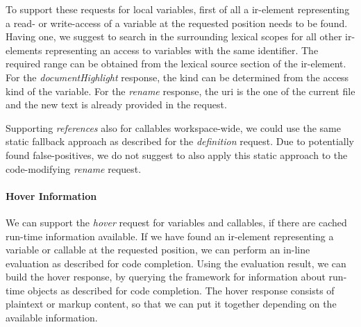 \documentclass[sigplan,10pt,review,anonymous]{acmart}
\begin{document}
    To support these requests for local variables, first of all a
    \ac{ir}-element representing a read- or write-access of a variable at the
    requested position needs to be found. Having one, we suggest to search in
    the surrounding lexical scopes for all other \ac{ir}-elements representing
    an access to variables with the same identifier. The required range can be
    obtained from the lexical source section of the \ac{ir}-element. For the
    \emph{documentHighlight} response, the kind can be determined from the
    access kind of the variable. For the \emph{rename} response, the \ac{uri} is
    the one of the current file and the new text is already provided in the
    request.

    Supporting \emph{references} also for callables workspace-wide, we could use the same static fallback approach as described for the \emph{definition} request. Due to potentially found false-positives, we do not suggest to also apply this static approach to the code-modifying \emph{rename} request.

    \paragraph{Hover Information}
    We can support the \emph{hover} request for variables and callables, if there are cached run-time information available. If we have found an \ac{ir}-element representing a variable or callable at the requested position, we can perform an in-line evaluation as described for code completion. Using the evaluation result, we can build the hover response, by querying the framework for information about run-time objects as described for code completion. The hover response consists of plaintext or markup content, so that we can put it together depending on the available information.




\end{document}
